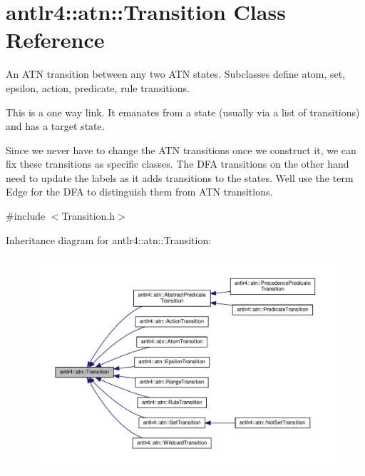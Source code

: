 \hypertarget{classantlr4_1_1atn_1_1Transition}{}\section{antlr4\+:\+:atn\+:\+:Transition Class Reference}
\label{classantlr4_1_1atn_1_1Transition}


An A\+TN transition between any two A\+TN states. Subclasses define atom, set, epsilon, action, predicate, rule transitions. 

This is a one way link. It emanates from a state (usually via a list of transitions) and has a target state. 

Since we never have to change the A\+TN transitions once we construct it, we can fix these transitions as specific classes. The D\+FA transitions on the other hand need to update the labels as it adds transitions to the states. We\textquotesingle{}ll use the term Edge for the D\+FA to distinguish them from A\+TN transitions.  




{\ttfamily \#include $<$Transition.\+h$>$}



Inheritance diagram for antlr4\+:\+:atn\+:\+:Transition\+:
\nopagebreak
\begin{figure}[H]
\begin{center}
\leavevmode
\includegraphics[width=350pt]{classantlr4_1_1atn_1_1Transition__inherit__graph}
\end{center}
\end{figure}
